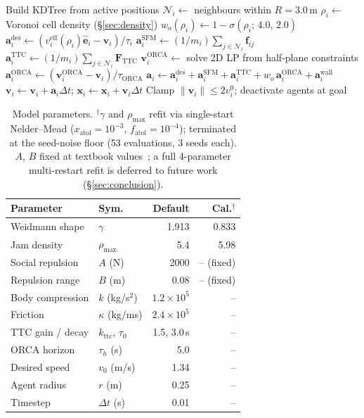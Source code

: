 \documentclass[a4paper,twoside]{article}
\begin{document}
\begin{algorithm}[h]
\caption{One simulation timestep (density-modulated additive steering).}\label{alg:step}
\begin{algorithmic}[1]
\State Build KDTree from active positions
\State $\mathcal{N}_i \gets$ neighbours within $R=3.0$\,m
\State $\rho_i \gets$ Voronoi cell density (\S\ref{sec:density})
\State $w_o(\rho_i) \gets 1 - \sigma(\rho_i;\,4.0,\,2.0)$
\State $\mathbf{a}^{\mathrm{des}}_i \gets (v^{\mathrm{eff}}_i(\rho_i)\hat{\mathbf{e}}_i - \mathbf{v}_i)/\tau_i$
\State $\mathbf{a}^{\mathrm{SFM}}_i \gets (1/m_i)\sum_{j\in\mathcal{N}_i}\mathbf{f}_{ij}$ 
\State $\mathbf{a}^{\mathrm{TTC}}_i \gets (1/m_i)\sum_{j\in\mathcal{N}_i}\mathbf{F}_{\mathrm{TTC}}$ 
\State $\mathbf{v}^{\mathrm{ORCA}}_i \gets$ solve 2D LP from half-plane constraints
\State $\mathbf{a}^{\mathrm{ORCA}}_i \gets (\mathbf{v}^{\mathrm{ORCA}}_i - \mathbf{v}_i)/\tau_{\mathrm{ORCA}}$
\State $\mathbf{a}_i \gets \mathbf{a}^{\mathrm{des}}_i + \mathbf{a}^{\mathrm{SFM}}_i + \mathbf{a}^{\mathrm{TTC}}_i + w_o\,\mathbf{a}^{\mathrm{ORCA}}_i + \mathbf{a}^{\mathrm{wall}}_i$
\State $\mathbf{v}_i \gets \mathbf{v}_i + \mathbf{a}_i\Delta t$; $\mathbf{x}_i \gets \mathbf{x}_i + \mathbf{v}_i\Delta t$
\State Clamp $\|\mathbf{v}_i\|\le 2 v_i^0$; deactivate agents at goal
\end{algorithmic}
\end{algorithm}

\begin{table}[h]
\caption{Model parameters. $^{\dagger}$$\gamma$ and $\rho_{\max}$ refit via single-start Nelder--Mead ($x_{\text{atol}}{=}10^{-3}$, $f_{\text{atol}}{=}10^{-4}$); terminated at the seed-noise floor (53 evaluations, 3 seeds each). $A$, $B$ fixed at textbook values~\cite{Helbing00}; a full 4-parameter multi-restart refit is deferred to future work (\S\ref{sec:conclusion}).}\label{tab:params}
\centering\scriptsize
\setlength{\tabcolsep}{5pt}
\begin{tabular}{@{}llrr@{}}
\toprule
\textbf{Parameter} & \textbf{Sym.} & \textbf{Default} & \textbf{Cal.$^{\dagger}$} \\
\midrule
Weidmann shape & $\gamma$ & 1.913 & 0.833 \\
Jam density & $\rho_{\max}$ & 5.4 & 5.98 \\
Social repulsion & $A$ (N) & 2000 & -- (fixed) \\
Repulsion range & $B$ (m) & 0.08 & -- (fixed) \\
Body compression & $k$ (kg/s$^2$) & $1.2{\times}10^5$ & -- \\
Friction & $\kappa$ (kg/ms) & $2.4{\times}10^5$ & -- \\
TTC gain / decay & $k_{\text{ttc}}$, $\tau_0$ & 1.5, 3.0\,s & -- \\
ORCA horizon & $\tau_h$ (s) & 5.0 & -- \\
Desired speed & $v_0$ (m/s) & 1.34 & -- \\
Agent radius & $r$ (m) & 0.25 & -- \\
Timestep & $\Delta t$ (s) & 0.01 & -- \\
\bottomrule
\end{tabular}
\end{table}
\end{document}
